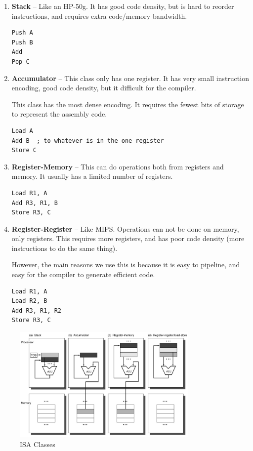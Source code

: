\documentclass{article}
\begin{document}
\begin{enumerate}

\item \textbf{Stack} -- Like an HP-50g. It has good code density, but is hard to reorder instructions, and requires extra code/memory bandwidth. 

\begin{Verbatim}
Push A
Push B
Add
Pop C
\end{Verbatim}

\item \textbf{Accumulator} -- This class only has one register. It has very small instruction encoding, good code density, but it difficult for the compiler. 

This class has the most dense encoding. It requires the fewest bits of storage to represent the assembly code.


\begin{Verbatim}
Load A
Add B  ; to whatever is in the one register
Store C
\end{Verbatim}


\item \textbf{Register-Memory} -- This can do operations both from registers and memory. It usually has a limited number of registers.


\begin{Verbatim}
Load R1, A
Add R3, R1, B
Store R3, C
\end{Verbatim}


\item \textbf{Register-Register} -- Like MIPS. Operations can not be done on memory, only registers. This requires more registers, and has poor code density (more instructions to do the same thing). 

However, the main reasons we use this is because it is easy to pipeline, and easy for the compiler to generate efficient code.


\begin{Verbatim}
Load R1, A
Load R2, B
Add R3, R1, R2
Store R3, C
\end{Verbatim}


\end{enumerate}

\begin{figure}[ht!]
\centering
\includegraphics[width=90mm]{img/ISAClasses.png}
\caption{ISA Classes}
\end{figure}
\end{document}
